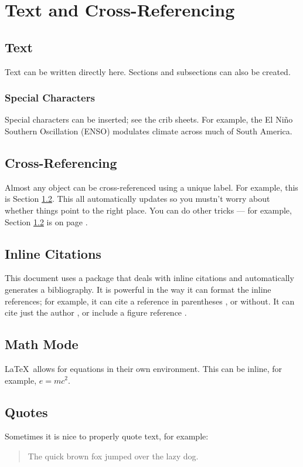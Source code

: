 \chapter{Text and Cross-Referencing}
\section{Text}
Text can be written directly here. Sections and subsections can also be created.

\subsection{Special Characters}
Special characters can be inserted; see the crib sheets. For example, the El Ni\~no Southern Oscillation (ENSO) modulates climate across much of South America. 

\section{Cross-Referencing} \label{subsectionxrefs}
Almost any object can be cross-referenced using a unique label. For example, this is Section \ref{subsectionxrefs}. This all automatically updates so you mustn't worry about whether things point to the right place. You can do other tricks --- for example, Section \ref{subsectionxrefs} is on page \pageref{subsectionxrefs}.

\section{Inline Citations}
This document uses a package that deals with inline citations and automatically generates a bibliography. It is powerful in the way it can format the inline references; for example, it can cite a reference in parentheses \citep[\textit{e.g.}][]{Payne2011}, or without. It can cite just the author \citeauthor{Porinchu2003}, or include a figure reference \citep[\textit{e.g.}][Figure 1]{Payne2011}. 

\section{Math Mode}
\LaTeX \ allows for equations in their own environment. This can be inline, for example, $e=mc^{2}$.

\section{Quotes}
Sometimes it is nice to properly quote text, for example:

\begin{quote}						
The quick brown fox jumped over the lazy dog.					
\end{quote}
